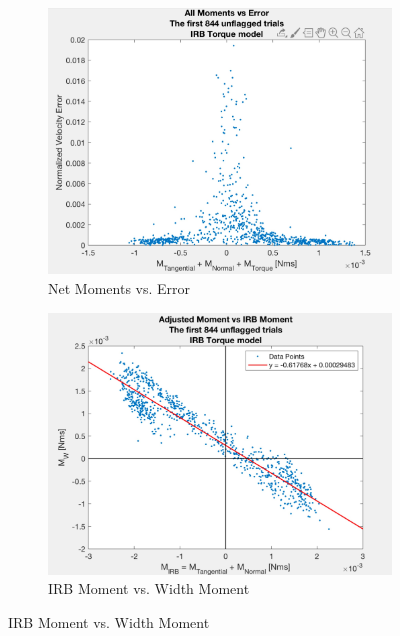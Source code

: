 \documentclass{article}
\begin{document}
\begin{figure}[ht]
    \caption{Varying Moment of Inertia}
    \centering
    \begin{subfigure}[b]{0.45\linewidth}
        \includegraphics[scale=0.25]{andy1.jpg}
        \caption{Net Moments vs. Error}
        \label{fig:andy1}
    \end{subfigure}
    \quad
    \begin{subfigure}[b]{0.45\linewidth}
       \includegraphics[scale=.25]{andy2.jpg}
        \caption{IRB Moment vs. Width Moment}
        \label{fig:andy2}
    \end{subfigure}
\end{figure}
\end{document}
